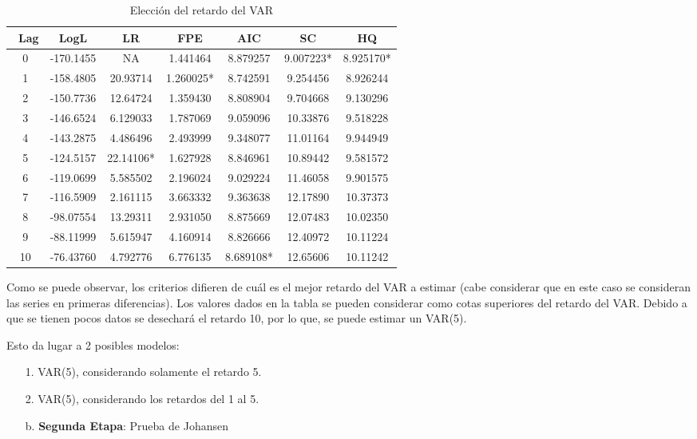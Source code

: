 \begin{table}[H]
\centering
\begin{tabular}{ccccccc}\hline\hline
~Lag & LogL & LR & FPE & AIC & SC & HQ \\ \hline\hline
0 & -170.1455 & NA & 1.441464 & 8.879257 & 9.007223* & 8.925170* \\
1 & -158.4805 & 20.93714 & 1.260025* & 8.742591 & 9.254456 & 8.926244 \\
2 & -150.7736 & 12.64724 & 1.359430 & 8.808904 & 9.704668 & 9.130296 \\
3 & -146.6524 & 6.129033 & 1.787069 & 9.059096 & 10.33876 & 9.518228 \\
4 & -143.2875 & 4.486496 & 2.493999 & 9.348077 & 11.01164 & 9.944949 \\
5 & -124.5157 & 22.14106* & 1.627928 & 8.846961 & 10.89442 & 9.581572 \\
6 & -119.0699 & 5.585502 & 2.196024 & 9.029224 & 11.46058 & 9.901575 \\
7 & -116.5909 & 2.161115 & 3.663332 & 9.363638 & 12.17890 & 10.37373 \\
8 & -98.07554 & 13.29311 & 2.931050 & 8.875669 & 12.07483 & 10.02350 \\
9 & -88.11999 & 5.615947 & 4.160914 & 8.826666 & 12.40972 & 10.11224 \\
10& -76.43760 & 4.792776 & 6.776135 & 8.689108* & 12.65606 & 10.11242 \\ \hline\hline
\end{tabular}
\caption{Elecci\'{o}n del retardo del VAR}
\label{tab7}
\end{table}

Como se puede observar, los criterios difieren de cu\'{a}l es el mejor retardo del VAR a estimar (cabe considerar que en este caso se consideran las series en primeras diferencias). Los valores dados en la tabla se pueden considerar como cotas superiores del retardo del VAR. Debido a que se tienen pocos datos se desechar\'{a} el retardo 10, por lo que, se puede estimar un VAR(5).\newline

Esto da lugar a 2 posibles modelos: 
\begin{enumerate}
\item[1.] VAR(5), considerando solamente el retardo 5.
\item[2.] VAR(5), considerando los retardos del 1 al 5.
\item[b.] \textbf{Segunda Etapa}: Prueba de Johansen
\end{enumerate}


